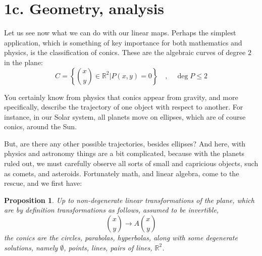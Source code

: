 \documentclass[12pt]{amsbook}
\newtheorem{proposition}[theorem]{Proposition}
\begin{document}
\section*{1c. Geometry, analysis}

Let us see now what we can do with our linear maps. Perhaps the simplest application, which is something of key importance for both mathematics and physics, is the classification of conics. These are the algebraic curves of degree $2$ in the plane:
$$C=\left\{\binom{x}{y}\in\mathbb R^2\Big|P(x,y)=0\right\}\quad,\quad\deg P\leq 2$$

You certainly know from physics that conics appear from gravity, and more specifically, describe the trajectory of one object with respect to another. For instance, in our Solar system, all planets move on ellipses, which are of course conics, around the Sun.

\bigskip

But, are there any other possible trajectories, besides ellipses? And here, with physics and astronomy things are a bit complicated, because with the planets ruled out, we must carefully observe all sorts of small and capricious objects, such as comets, and asteroids. Fortunately math, and linear algebra, come to the rescue, and we first have:


\begin{proposition}
Up to non-degenerate linear transformations of the plane, which are by definition transformations as follows, assumed to be invertible,
$$\binom{x}{y}\to A\binom{x}{y}$$
the conics are the circles, parabolas, hyperbolas, along with some degenerate solutions, namely $\emptyset$, points, lines, pairs of lines, $\mathbb R^2$.
\end{proposition}
\end{document}
